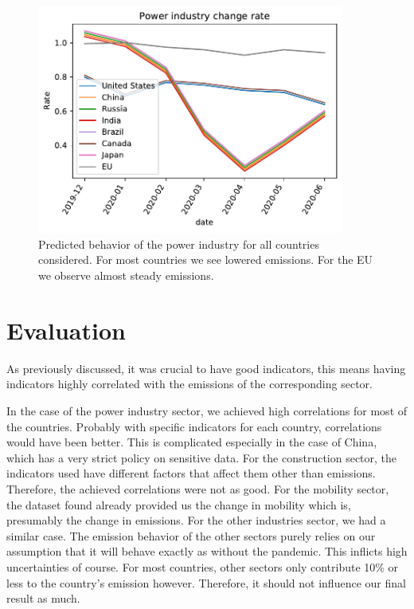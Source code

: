 \begin{figure}[H]
	\centering
	\includegraphics[width=0.9\textwidth]{img/Power_industry_rate.pdf}
	\caption{Predicted behavior of the power industry for all countries considered. For most countries we see lowered emissions. For the EU we observe almost steady \co emissions.}
	\label{fig:power_ind_change_rate}
\end{figure}


\section*{Evaluation}

As previously discussed, it was crucial to have good indicators, this means having indicators highly correlated with the emissions of the corresponding sector.

In the case of the power industry sector, we achieved high correlations for most of the countries. Probably with specific indicators for each country, correlations would have been better. This is complicated especially in the case of China, which has a very strict policy on sensitive data.
For the construction sector, the indicators used have different factors that affect them other than emissions. Therefore, the achieved correlations were not as good.
For the mobility sector, the dataset found already provided us the change in mobility which is, presumably the change in emissions. For the other industries sector, we had a similar case.
The emission behavior of the other sectors purely relies on our assumption that it will behave exactly as without the pandemic. This inflicts high uncertainties of course. For most countries, other sectors only contribute 10\% or less to the country's emission however. Therefore, it should not influence our final result as much.

